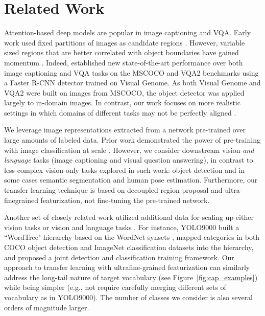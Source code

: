 \documentclass[11pt,a4paper]{article}
\begin{document}
 \section{Related Work}

Attention-based deep models are popular in image captioning and VQA.
Early work used fixed partitions of images as candidate regions \cite{xu15show}.
However, variable sized regions that are better correlated with object boundaries have gained momentum \cite{fu17aligning,pedersoli17areas,anderson18bottomup}.
Indeed,  established new state-of-the-art performance over
both image captioning and VQA tasks on the MSCOCO and VQA2 benchmarks using a Faster R-CNN detector trained on Visual Genome.
As both Visual Genome and VQA2 were built on images from MSCOCO, the object detector was applied largely to in-domain images.
In contrast, our work focuses on more realistic settings in which domains of different tasks may not be perfectly aligned \cite{chen18domain}.

We leverage image representations extracted from
a network pre-trained over large amounts of labeled data.
Prior work demonstrated the power of pre-training with image classification at scale \cite{sun17revisiting,mahajan18exploring,wu19tencent}.
However, we consider downstream vision \emph{and language} tasks (image captioning and visual question answering), in contrast to less complex
vision-only tasks explored in such work: object detection and in some cases semantic segmentation and human pose estimation.
Furthermore, our transfer learning technique is based on decoupled region proposal and ultra-finegrained featurization, not fine-tuning the pre-trained network.

Another set of closely related work utilized additional data for scaling up either vision tasks \cite{hoffman16large,tang17visual,redmon17yolo} or vision and language tasks \cite{venugopalan17captioning,lu18neural,noh19transfer}.
For instance, YOLO9000 \cite{redmon17yolo} built a ``WordTree" hierarchy based on the WordNet synsets \cite{miller90wordnet}, mapped categories in both COCO object detection and ImageNet classification datasets into the hierarchy, and proposed a joint detection and classification training framework.
Our approach to transfer learning with ultrafine-grained featurization can similarly address the long-tail nature of target vocabulary (see Figure~\ref{fig:cap_examples}) while being simpler (e.g., not require carefully merging different sets of vocabulary as in YOLO9000).
The number of classes we consider is also several orders of magnitude larger.
\end{document}
